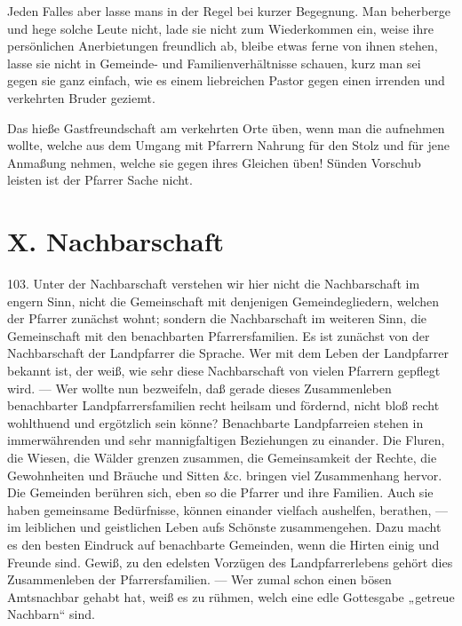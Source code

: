 Jeden Falles aber lasse mans in der Regel bei kurzer Begegnung. Man beherberge und hege solche Leute nicht, lade sie nicht zum Wiederkommen ein, weise ihre persönlichen Anerbietungen freundlich ab, bleibe etwas ferne von ihnen stehen, lasse sie nicht in Gemeinde- und Familienverhältnisse schauen, kurz man sei gegen sie ganz einfach, wie es einem liebreichen Pastor gegen einen irrenden und verkehrten Bruder geziemt.

Das hieße Gastfreundschaft am verkehrten Orte üben, wenn man die aufnehmen wollte, welche aus dem Umgang mit Pfarrern Nahrung für den Stolz und für jene Anmaßung nehmen, welche sie gegen ihres Gleichen üben! Sünden Vorschub leisten ist der Pfarrer Sache nicht.

\section{X. Nachbarschaft}

103. Unter der Nachbarschaft verstehen wir hier nicht die Nachbarschaft im engern Sinn, nicht die Gemeinschaft mit denjenigen Gemeindegliedern, welchen der Pfarrer zunächst wohnt; sondern die Nachbarschaft im weiteren Sinn, die Gemeinschaft mit den benachbarten Pfarrersfamilien. Es ist zunächst von der Nachbarschaft der Landpfarrer die Sprache. Wer mit dem Leben der Landpfarrer bekannt ist, der weiß, wie sehr diese Nachbarschaft von vielen Pfarrern gepflegt wird. — Wer wollte nun bezweifeln, daß gerade dieses Zusammenleben benachbarter Landpfarrersfamilien recht heilsam und fördernd, nicht bloß recht wohlthuend und ergötzlich sein könne? Benachbarte Landpfarreien stehen in immerwährenden und sehr mannigfaltigen Beziehungen zu einander. Die Fluren, die Wiesen, die Wälder grenzen zusammen, die Gemeinsamkeit der Rechte, die Gewohnheiten und Bräuche und Sitten \&c. bringen viel Zusammenhang hervor. Die Gemeinden berühren sich, eben so die Pfarrer und ihre Familien. Auch sie haben gemeinsame Bedürfnisse, können einander vielfach aushelfen,
berathen, — im leiblichen und geistlichen Leben aufs Schönste zusammengehen. Dazu macht es den besten Eindruck auf benachbarte Gemeinden, wenn die Hirten einig und Freunde sind. Gewiß, zu den edelsten Vorzügen des Landpfarrerlebens gehört dies Zusammenleben der Pfarrersfamilien. — Wer zumal schon einen bösen Amtsnachbar gehabt hat, weiß es zu rühmen, welch eine edle Gottesgabe „getreue Nachbarn“ sind.


